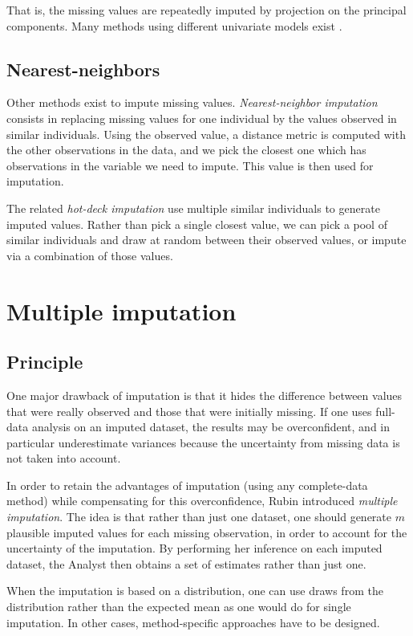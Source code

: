That is, the missing values are repeatedly imputed by projection on the principal components. Many methods using different univariate models exist \cite{MICE_founding}\cite{stekhoven2015missforest}\cite{van2007multiple}.
		
		\subsection{Nearest-neighbors}
Other methods exist to impute missing values. \emph{Nearest-neighbor imputation}\cite{chen2000nearest}  consists in replacing missing values for one individual by the values observed in similar individuals. Using the observed value, a distance metric is computed with the other observations in the data, and we pick the closest one which has observations in the variable we need to impute. This value is then used for imputation.

 The related \emph{hot-deck imputation} \cite{andridge2010hotdeck} use multiple similar individuals to generate imputed values. Rather than pick a single closest value, we can pick a pool of similar individuals and draw at random between their observed values, or impute via a combination of those values.

	\section{Multiple imputation}
		\subsection{Principle}
One major drawback of imputation is that it hides the difference between values that were really observed and those that were initially missing. If one uses full-data analysis on an imputed dataset, the results may be overconfident, and in particular underestimate variances because the uncertainty from missing data is not taken into account.

In order to retain the advantages of imputation (using any complete-data method) while compensating for this overconfidence, Rubin \cite{rubin1986mi_founding} introduced \emph{multiple imputation}. The idea is that rather than just one dataset, one should generate $m$ plausible imputed values for each missing observation, in order to account for the uncertainty of the imputation. By performing her inference on each imputed dataset, the Analyst then obtains a set of estimates rather than just one. 

When the imputation is based on a distribution, one can use draws from the distribution rather than the expected mean as one would do for single imputation. In other cases, method-specific approaches have to be designed.

